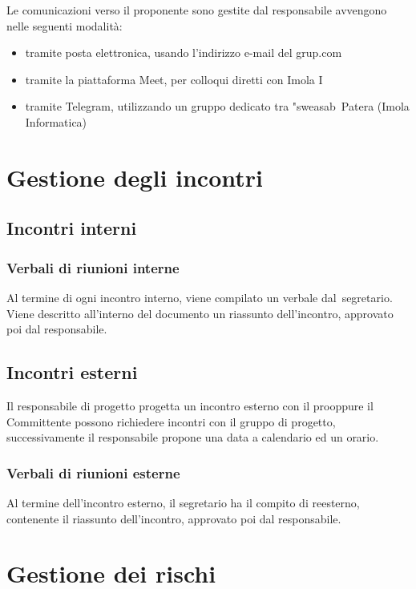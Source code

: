 Le comunicazioni verso il proponente sono gestite dal responsabile \e avvengono nelle seguenti modalità:

\begin{itemize}
\item tramite posta elettronica, usando l'indirizzo e-mail del grup\gmail.com
\item tramite la piattaforma Meet, per colloqui diretti con Imola I\
\item tramite Telegram, utilizzando un gruppo dedicato tra "sweasab\ Patera (Imola Informatica)
\end{itemize}

\section{Gestione degli incontri}

\subsection{Incontri interni}

\subsubsection{Verbali di riunioni interne}

Al termine di ogni incontro interno, viene compilato un verbale dal\ segretario. Viene descritto all'interno del documento un riassunto dell'incontro, approvato poi dal responsabile.

\subsection{Incontri esterni}

Il responsabile di progetto progetta un incontro esterno con il pro\proponente oppure il Committente possono richiedere incontri con il gruppo di progetto, successivamente il responsabile propone una data a calendario ed un orario.

\subsubsection{Verbali di riunioni esterne}

Al termine dell'incontro esterno, il segretario ha il compito di re\rbale esterno, contenente il riassunto dell'incontro, approvato poi dal responsabile.

\section{Gestione dei rischi}

